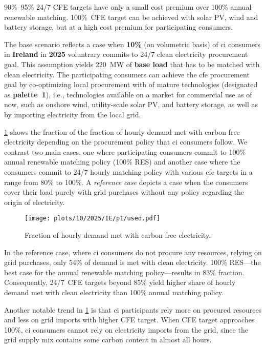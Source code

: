 \begin{res}
    90\%--95\% 24/7 CFE targets have only a small cost premium over 100\% annual renewable matching. 100\%~CFE target can be achieved with solar PV, wind and battery storage, but at a high cost premium for participating consumers.
\end{res}

The base scenario reflects a case when \textbf{10\%} (on volumetric basis) of \gls{ci} consumers in \textbf{Ireland} in \textbf{2025} voluntrary commits to 24/7 clean electricity procurement goal.
This assumption yields 220~MW of \textbf{base load} that has to be matched with clean electricity. 
The participating consumers can achieve the \gls{cfe} procurement goal by co-optimizing local procurement with of mature technologies (designated as \textbf{palette~1}), i.e., technologies available on a market for commercial use as of now, such as onshore wind, utility-scale solar PV, and battery storage, as well as by importing electricity from the local grid.

\cref{fig:10-2025-IE-p1-used} shows the fraction of the fraction of hourly demand met with carbon-free electricity depending on the procurement policy that \gls{ci} consumers follow.
We contrast two main cases, one where participating consumers commit to 100\% annual renewable matching policy (100\% RES) and another case where the consumers commit to 24/7 hourly matching policy with various \gls{cfe} targets in a range from 80\% to 100\%. 
A \textit{reference case} depicts a case when the consumers cover their load purely with grid purchases without any policy regarding the origin of electricity.

\begin{figure}
    \centering
    \texttt{[image: plots/10/2025/IE/p1/used.pdf]}
    \caption{Fraction of hourly demand met with carbon-free electricity.}
    \label{fig:10-2025-IE-p1-used}
\end{figure}

In the reference case, where \gls{ci} consumers do not procure any resources, relying on grid purchases, only 54\% of demand is met with clean electricity.
100\% RES---the best case for the annual renewable matching policy---results in 83\% fraction. 
Consequently, 24/7~CFE targets beyond 85\% yield higher share of hourly demand met with clean electricity than 100\% annual matching policy.

Another notable trend in \cref{fig:10-2025-IE-p1-used} is that \gls{ci} participants rely more on procured resources and less on grid imports with higher CFE target.
When CFE target approaches 100\%, \gls{ci} consumers cannot rely on electricity imports from the grid, since the grid supply mix contains some carbon content in almost all hours.


